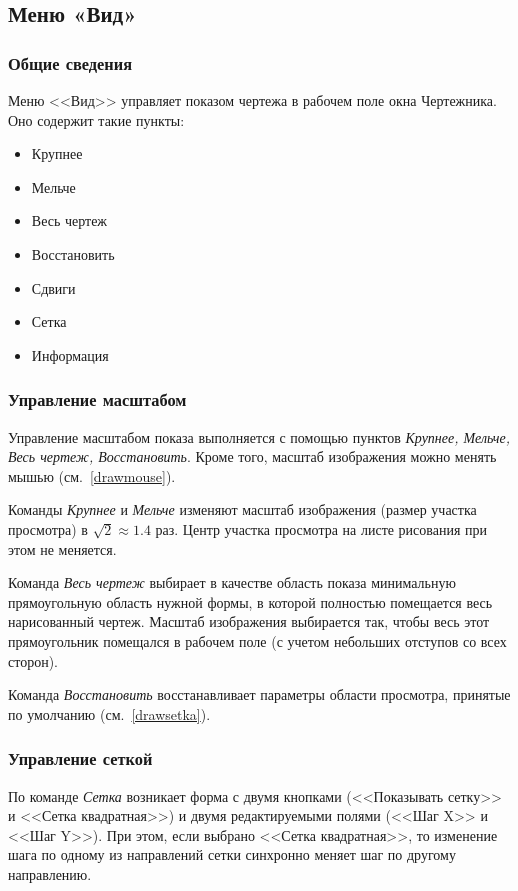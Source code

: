 \documentclass[12pt,a4paper]{article}
\begin{document}
\subsection[Меню ''Вид'']{Меню «Вид»}

\subsubsection{Общие сведения}

Меню <<Вид>> управляет показом чертежа в рабочем поле окна Чертежника. Оно содержит такие пункты:
\begin{itemize}
\item Крупнее 
\item Мельче
\item Весь чертеж
\item Восстановить 
\item Сдвиги 
\item Сетка
\item Информация
\end{itemize}

\subsubsection{Управление масштабом}

Управление масштабом показа выполняется с помощью пунктов \emph{Крупнее, Мельче, Весь чертеж, Восстановить}. Кроме того, масштаб изображения можно менять мышью (см.~\ref{drawmouse}).

Команды \emph{Крупнее} и \emph{Мельче} изменяют масштаб изображения (размер участка просмотра) в $\sqrt{2} \approx 1.4$ раз. Центр участка просмотра на листе рисования при этом не меняется.

Команда \emph{Весь чертеж} выбирает в качестве область показа минимальную прямоугольную область нужной формы, в которой полностью помещается весь нарисованный чертеж. Масштаб изображения выбирается так, чтобы весь этот прямоугольник помещался в рабочем поле (с учетом небольших отступов со всех сторон). 

Команда \emph{Восстановить} восстанавливает параметры области просмотра, принятые по умолчанию (см.~\ref{drawsetka}).

\subsubsection{Управление сеткой}

По команде \emph{Сетка} возникает форма с двумя кнопками (<<Показывать сетку>> и <<Сетка квадратная>>) и двумя редактируемыми полями (<<Шаг X>> и <<Шаг Y>>). При этом, если выбрано <<Сетка квадратная>>, то изменение шага по одному из направлений сетки синхронно меняет шаг по другому направлению.
\end{document}
